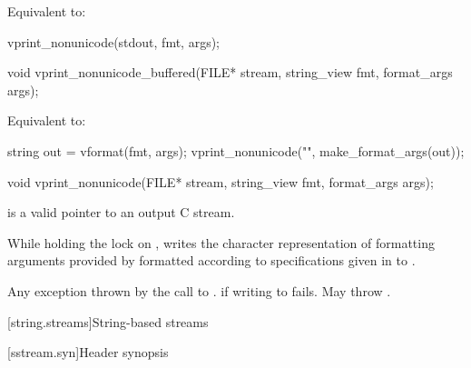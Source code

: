 \begin{itemdescr}
\pnum
\effects
Equivalent to:
\begin{codeblock}
vprint_nonunicode(stdout, fmt, args);
\end{codeblock}
\end{itemdescr}

%
\begin{itemdecl}
void vprint_nonunicode_buffered(FILE* stream, string_view fmt, format_args args);
\end{itemdecl}

\begin{itemdescr}
\pnum
\effects
Equivalent to:
\begin{codeblock}
string out = vformat(fmt, args);
vprint_nonunicode("{}", make_format_args(out));
\end{codeblock}
\end{itemdescr}

%
\begin{itemdecl}
void vprint_nonunicode(FILE* stream, string_view fmt, format_args args);
\end{itemdecl}

\begin{itemdescr}
\pnum
\expects
{} is a valid pointer to an output C stream.

\pnum
\effects
While holding the lock on ,
writes the character representation of
formatting arguments provided by 
formatted according to specifications given in  to .

\pnum
\throws
Any exception thrown by the call to .
 if writing to  fails.
May throw .
\end{itemdescr}

[string.streams]{String-based streams}

[sstream.syn]{Header  synopsis}

